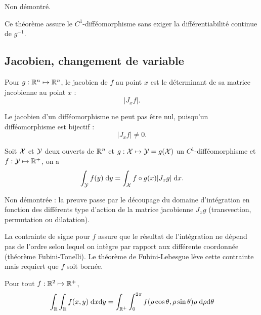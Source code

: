 \proof Non démontré. \eproof

\remark
Ce théorème assure le $C^1$-difféomorphisme sans exiger la différentiabilité continue de $g^{-1}$.

\subsection{Jacobien, changement de variable}

\begin{definition*}[Jacobien]
  Pour $g : \mathbb{R}^n \mapsto \mathbb{R}^n$, le jacobien de $f$ au point $x$ est le déterminant de sa matrice jacobienne au point $x$ : 
  $$
  |J_x f|.
  $$
\end{definition*}

\remark
Le jacobien d'un difféomorphisme ne peut pas être nul, puisqu'un difféomorphisme est bijectif :
$$
|J_x f| \neq 0.
$$

\begin{theorem*}
  Soit $\mathcal{X}$ et $\mathcal{Y}$ deux ouverts de $\mathbb{R}^n$ et $g : \mathcal{X} \mapsto \mathcal{Y} = g(\mathcal{X})$ un $C^1$-difféomorphisme et $f : \mathcal{Y} \mapsto \mathbb{R}^+$, on a 
  $$
  \int_{\mathcal{Y}} f(y) \; \text{d} y = \int_{\mathcal{X}} f \circ g(x) |J_x g| \; \text{d} x.
  $$
\end{theorem*}

\proof
Non démontrée : la preuve passe par le découpage du domaine d'intégration en fonction des différents type d'action de la matrice jacobienne $J_x g$ (transvection, permutation ou
dilatation).
\eproof

\remark
La contrainte de signe pour $f$ assure que le résultat de l'intégration ne dépend pas de l'ordre selon lequel on intègre par rapport aux différente coordonnée (théorème Fubini-Tonelli). Le théorème de Fubini-Lebesgue lève cette contrainte mais requiert que $f$ soit bornée.

\begin{corollary*}
  Pour tout $f : \mathbb{R}^2 \mapsto \mathbb{R}^+$, 
  $$
  \int_{\mathbb{R}} \int_{\mathbb{R}} f(x, y) \; \text{d} x \text{d} y
  = \int_{\mathbb{R}^+} \int_0^{2 \pi} f(\rho \cos \theta, \rho \sin \theta) \rho \; \text{d} \rho \text{d} \theta
  $$
\end{corollary*}


